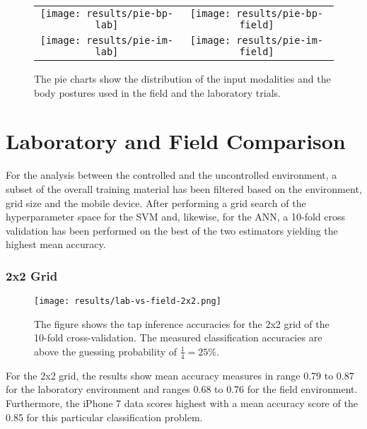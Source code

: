 \begin{figure}
  \centering
  \begin{tabular}{cc}
    \texttt{[image: results/pie-bp-lab]} &   \texttt{[image: results/pie-bp-field]} \\
   \texttt{[image: results/pie-im-lab]} &   \texttt{[image: results/pie-im-field]} \\
  \end{tabular}
  \caption{The pie charts show the distribution of the input modalities and the body postures used in the field and the laboratory trials.}\label{fig:bpimdis}
\end{figure}



\section{Laboratory and Field Comparison}
For the analysis between the controlled and the uncontrolled environment, a subset of the overall training material has been filtered based on the environment, grid size and the mobile device. After performing a grid search of the hyperparameter space for the SVM and, likewise, for the ANN, a 10-fold cross validation has been performed on the best of the two estimators yielding the highest mean accuracy.

\subsubsection{2x2 Grid}

\begin{figure}[h!]
  \centering
  \texttt{[image: results/lab-vs-field-2x2.png]}
  \caption{The figure shows the tap inference accuracies for the 2x2 grid of the 10-fold cross-validation. The measured classification accuracies are above the guessing probability of $\frac{1}{4} = 25\%$.} \label{fig:lab2x2}
\end{figure}

For the 2x2 grid, the results show mean accuracy measures in range 0.79 to 0.87 for the laboratory environment and ranges 0.68 to 0.76 for the field environment. Furthermore, the iPhone 7 data scores highest with a mean accuracy score of the 0.85 for this particular classification problem.

